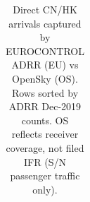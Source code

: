\documentclass[
  authoryear,
  preprint,
  3p,
  onecolumn]{elsarticle}
\begin{document}
\begin{longtable}[]{@{}
  >{\raggedright\arraybackslash}p{}
  >{\raggedleft\arraybackslash}p{}
  >{\raggedleft\arraybackslash}p{}
  >{\raggedleft\arraybackslash}p{}
  >{\raggedleft\arraybackslash}p{}
  >{\raggedleft\arraybackslash}p{}
  >{\raggedright\arraybackslash}p{}
  >{\raggedright\arraybackslash}p{}@{}}

\caption{\label{tbl-os-vs-eu-full}Direct CN/HK arrivals captured by
EUROCONTROL ADRR (EU) vs OpenSky (OS). Rows sorted by ADRR Dec-2019
counts. OS reflects receiver coverage, not filed IFR (S/N passenger
traffic only).}

\tabularnewline


\end{longtable}
\end{document}

